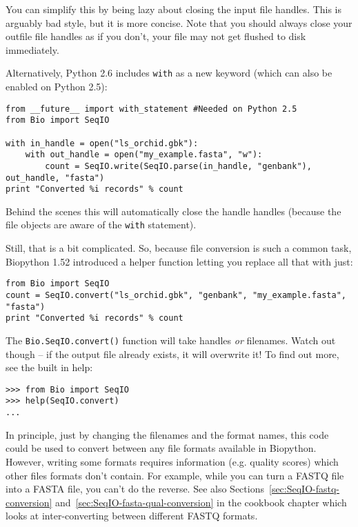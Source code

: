\documentclass{report}
\begin{document}
You can simplify this by being lazy about closing the input file handles. This
is arguably bad style, but it is more concise. Note that you should always
close your outfile file handles as if you don't, your file may not get flushed
to disk immediately.

Alternatively, Python 2.6 includes \verb|with| as a new keyword (which can
also be enabled on Python 2.5):

\begin{verbatim}
from __future__ import with_statement #Needed on Python 2.5
from Bio import SeqIO

with in_handle = open("ls_orchid.gbk"):
    with out_handle = open("my_example.fasta", "w"):
        count = SeqIO.write(SeqIO.parse(in_handle, "genbank"), out_handle, "fasta")
print "Converted %i records" % count
\end{verbatim}

\noindent Behind the scenes this will automatically close the handle handles
(because the file objects are aware of the \verb|with| statement).

Still, that is a bit complicated. So, because file conversion is such a
common task, Biopython 1.52 introduced a helper function letting you replace
all that with just:

\begin{verbatim}
from Bio import SeqIO
count = SeqIO.convert("ls_orchid.gbk", "genbank", "my_example.fasta", "fasta")
print "Converted %i records" % count
\end{verbatim}

The \verb|Bio.SeqIO.convert()| function will take handles \emph{or} filenames.
Watch out though -- if the output file already exists, it will overwrite it!
To find out more, see the built in help:

\begin{verbatim}
>>> from Bio import SeqIO
>>> help(SeqIO.convert)
...
\end{verbatim}

In principle, just by changing the filenames and the format names, this code
could be used to convert between any file formats available in Biopython.
However, writing some formats requires information (e.g. quality scores) which
other files formats don't contain. For example, while you can turn a FASTQ
file into a FASTA file, you can't do the reverse. See also
Sections~\ref{sec:SeqIO-fastq-conversion} and~\ref{sec:SeqIO-fasta-qual-conversion}
in the cookbook chapter which looks at inter-converting between different FASTQ formats.
\end{document}
